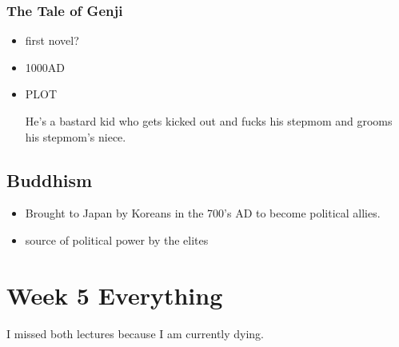 \documentclass{report}
\begin{document}
\subsection{The Tale of Genji}
\begin{itemize}
\item
first novel?
\item
1000AD
\item
PLOT

He's a bastard kid who gets kicked out and fucks his stepmom and grooms his stepmom's niece.


\end{itemize}


\section{Buddhism}
\begin{itemize}
\item
Brought to Japan by Koreans in the 700's AD to become political allies.
\item
source of political power by the elites

\end{itemize}


\chapter*{Week 5 Everything}
I missed both lectures because I am currently dying.
\end{document}
